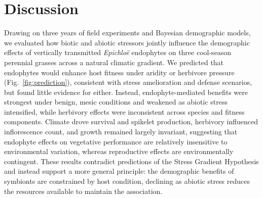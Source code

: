 \documentclass[12pt]{article}\usepackage[]{graphicx}\usepackage[dvipsnames]{xcolor}
\begin{document}
\section*{Discussion}
Drawing on three years of field experiments and Bayesian demographic models, we evaluated how biotic and abiotic stressors jointly influence the demographic effects of vertically 
transmitted \textit{Epichloë} endophytes on three cool-season perennial grasses across a natural climatic gradient. 
We predicted that endophytes would enhance host fitness under aridity or herbivore pressure (Fig.~\ref{fig:prediction}), consistent with stress amelioration and defense scenarios, but found little evidence for either. 
Instead, endophyte-mediated benefits were strongest under benign, mesic conditions and weakened as abiotic stress intensified, while herbivory effects were inconsistent across species and fitness components. 
Climate drove survival and spikelet production, herbivory influenced inflorescence count, and growth remained largely invariant, suggesting that endophyte effects on vegetative performance are relatively insensitive to environmental variation, whereas reproductive effects are environmentally contingent. 
These results contradict predictions of the Stress Gradient Hypothesis and instead support a more general principle: the demographic benefits of symbionts are constrained by host condition, declining as abiotic stress reduces the resources available to maintain the association.
\end{document}
